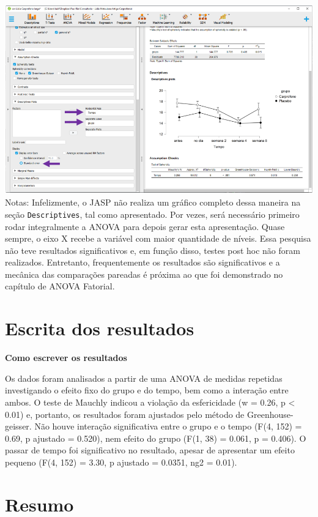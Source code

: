 \documentclass[
]{book}
\begin{document}
\includegraphics{./img/cap_anovarm_grafico.png}
Notas: Infelizmente, o JASP não realiza um gráfico completo dessa maneira na seção \texttt{Descriptives}, tal como apresentado. Por vezes, será necessário primeiro rodar integralmente a ANOVA para depois gerar esta apresentação. Quase sempre, o eixo X recebe a variável com maior quantidade de níveis. Essa pesquisa não teve resultados significativos e, em função disso, testes post hoc não foram realizados. Entretanto, frequentemente os resultados são significativos e a mecânica das comparações pareadas é próxima ao que foi demonstrado no capítulo de ANOVA Fatorial.

\hypertarget{escrita-dos-resultados-10}{%
\section{Escrita dos resultados}\label{escrita-dos-resultados-10}}

\textbf{Como escrever os resultados}

Os dados foram analisados a partir de uma ANOVA de medidas repetidas investigando o efeito fixo do grupo e do tempo, bem como a interação entre ambos. O teste de Mauchly indicou a violação da esfericidade (w = 0.26, p \textless{} 0.01) e, portanto, os resultados foram ajustados pelo método de Greenhouse-geisser. Não houve interação significativa entre o grupo e o tempo (F(4, 152) = 0.69, p ajustado = 0.520), nem efeito do grupo (F(1, 38) = 0.061, p = 0.406). O passar de tempo foi significativo no resultado, apesar de apresentar um efeito pequeno (F(4, 152) = 3.30, p ajustado = 0.0351, ng2 = 0.01).

\hypertarget{resumo-12}{%
\section{Resumo}\label{resumo-12}}
\end{document}
